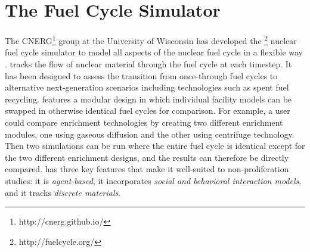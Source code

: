 \section{The \Cyclus Fuel Cycle Simulator}
\label{s_methods}

The \gls{CNERG}\footnote{http://cnerg.github.io/} group at the University of Wisconsin has developed the \Cyclus\footnote{http://fuelcycle.org/} nuclear fuel cycle simulator to model all aspects of the nuclear fuel cycle in a flexible way \cite{cyclus_v1_0,cyclus_v1_2,cyclus_v1_3}.  \Cyclus tracks the flow of nuclear material through the fuel cycle at each timestep. It has been designed to assess the transition from once-through fuel cycles to alternative next-generation scenarios including technologies such as spent fuel recycling. \Cyclus features a modular design in which individual facility models can be swapped in otherwise identical fuel cycles for comparison. For example, a user could compare enrichment technologies by creating two different enrichment modules, one using gaseous diffusion and the other using centrifuge technology. Then two simulations can be run where the entire fuel cycle is identical except for the two different enrichment designs, and the results can therefore be directly compared.  \Cyclus has three key features that make it well-suited to non-proliferation studies: it is \textit{agent-based}, it incorporates \textit{social and behavioral interaction models}, and it tracks \textit{discrete materials}.

